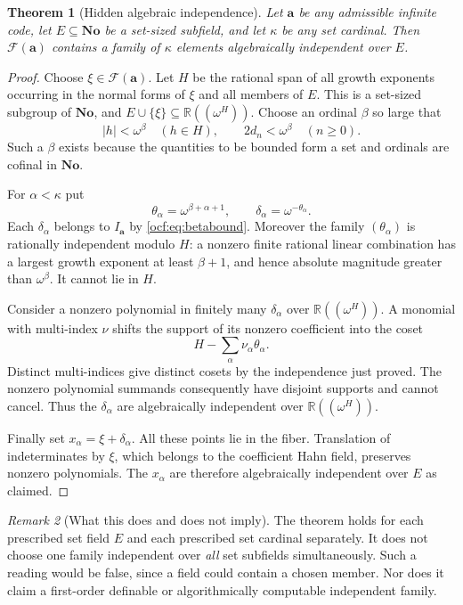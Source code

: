 \documentclass[11pt,a4paper]{article}
\numberwithin{equation}{section}
\newtheorem{theorem}{Theorem}[section]
\theoremstyle{definition}
\theoremstyle{remark}
\newtheorem{remark}[theorem]{Remark}
\newcommand{\No}{\mathbf{No}}
\newcommand{\R}{\mathbb R}
\newcommand{\F}{\mathcal F}
\newcommand{\codea}{\boldsymbol a}
\begin{document}
\begin{theorem}[Hidden algebraic independence]\label{ocf:thm:independence}
Let $\codea$ be any admissible infinite code, let $E\subseteq\No$ be a
set-sized subfield, and let $\kappa$ be any set cardinal. Then
$\F(\codea)$ contains a family of $\kappa$ elements algebraically
independent over $E$.
\end{theorem}
\begin{proof}
Choose $\xi\in\F(\codea)$. Let $H$ be the rational span of all growth
exponents occurring in the normal forms of $\xi$ and all members of $E$.
This is a set-sized subgroup of $\No$, and
$E\cup\{\xi\}\subseteq\R((\omega^H))$.
Choose an ordinal $\beta$ so large that
\begin{equation}\label{ocf:eq:betabound}
 |h|<\omega^\beta\quad(h\in H),\qquad
 2d_n<\omega^\beta\quad(n\ge0).
\end{equation}
Such a $\beta$ exists because the quantities to be bounded form a set and
ordinals are cofinal in $\No$.

For $\alpha<\kappa$ put
\[
 \theta_\alpha=\omega^{\beta+\alpha+1},\qquad
 \delta_\alpha=\omega^{-\theta_\alpha}.
\]
Each $\delta_\alpha$ belongs to $I_{\codea}$ by \eqref{ocf:eq:betabound}.
Moreover the family $(\theta_\alpha)$ is rationally independent modulo
$H$: a nonzero finite rational linear combination has a largest growth
exponent at least $\beta+1$, and hence absolute magnitude greater than
$\omega^\beta$. It cannot lie in $H$.

Consider a nonzero polynomial in finitely many $\delta_\alpha$ over
$\R((\omega^H))$. A monomial with multi-index $\nu$ shifts the support of
its nonzero coefficient into the coset
\[
 H-\sum_\alpha\nu_\alpha\theta_\alpha.
\]
Distinct multi-indices give distinct cosets by the independence just
proved. The nonzero polynomial summands consequently have disjoint
supports and cannot cancel. Thus the $\delta_\alpha$ are algebraically
independent over $\R((\omega^H))$.

Finally set $x_\alpha=\xi+\delta_\alpha$. All these points lie in the
fiber. Translation of indeterminates by $\xi$, which belongs to the
coefficient Hahn field, preserves nonzero polynomials. The $x_\alpha$
are therefore algebraically independent over $E$ as claimed.
\end{proof}

\begin{remark}[What this does and does not imply]\label{ocf:rem:independence}
The theorem holds for each prescribed set field $E$ and each prescribed
set cardinal separately. It does not choose one family independent over
\emph{all} set subfields simultaneously. Such a reading would be false,
since a field could contain a chosen member. Nor does it claim a
first-order definable or algorithmically computable independent family.
\end{remark}
\end{document}
